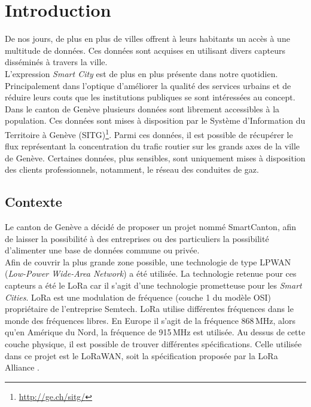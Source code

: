 \chapter{Introduction}
\label{1_introduction}


De nos jours, de plus en plus de villes offrent à leurs habitants un accès à une multitude de données. Ces données sont acquises en utilisant divers capteurs disséminés à travers la ville. \\

L'expression \textit{Smart City} est de plus en plus présente dans notre quotidien. Principalement dans l'optique d'améliorer la qualité des services urbains et de réduire leurs couts que les institutions publiques se sont intéressées au concept. \\


Dans le canton de Genève plusieurs données sont librement accessibles à la population. Ces données sont mises à disposition par le Système d'Information du Territoire à Genève (SITG)\footnote{\url{http://ge.ch/sitg/}}. Parmi ces données, il est possible de récupérer le flux représentant la concentration du trafic routier sur les grands axes de la ville de Genève. Certaines données, plus sensibles, sont uniquement mises à disposition des clients professionnels, notamment, le réseau des conduites de gaz.


\section{Contexte}

Le canton de Genève a décidé de proposer un projet nommé SmartCanton, afin de laisser la possibilité à des entreprises ou des particuliers la possibilité d'alimenter une base de données commune ou privée.  \\

Afin de couvrir la plus grande zone possible, une technologie de type LPWAN (\textit{Low-Power Wide-Area Network}) a été utilisée. La technologie retenue pour ces capteurs a été le LoRa \cite{LPWANWik40:online} car il s'agit d'une technologie prometteuse pour les \textit{Smart Cities}. LoRa est une modulation de fréquence (couche 1 du modèle OSI) propriétaire de l'entreprise Semtech. LoRa utilise différentes fréquences dans le monde des fréquences libres. En Europe il s'agit de la fréquence 868\,MHz, alors qu'en Amérique du Nord, la fréquence de 915\,MHz est utilisée. Au dessus de cette couche physique, il est possible de  trouver différentes spécifications. Celle utilisée dans ce projet est le LoRaWAN, soit la spécification proposée par la LoRa Alliance \cite{loraalli46:online}. \\

